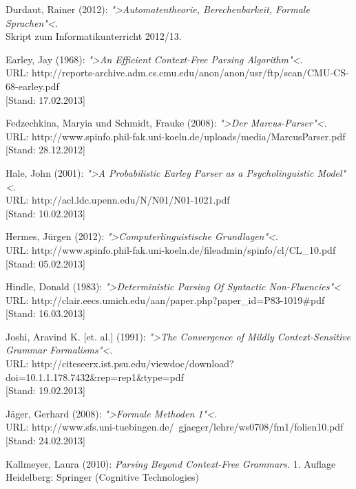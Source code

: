 \documentclass[12pt,a4paper]{article}
\theoremstyle{definition}
\begin{document}
\begin{thebibliography}{99}
		Durdaut, Rainer (2012):
		\emph{">Automatentheorie, Berechenbarkeit, Formale Sprachen"<}.\\
		Skript zum Informatikunterricht 2012/13.

		Earley, Jay (1968):
		\emph{">An Efficient Context-Free Parsing Algorithm"<}.\\
		URL: http://reports-archive.adm.cs.cmu.edu/anon/anon/usr/ftp/scan/CMU-CS-68-earley.pdf\\
		{[Stand: 17.02.2013]}

		Fedzechkina, Maryia und Schmidt, Frauke (2008):
		\emph{">Der Marcus-Parser"<}.\\
		URL: http://www.spinfo.phil-fak.uni-koeln.de/uploads/media/MarcusParser.pdf\\
		{[Stand: 28.12.2012]}

		Hale, John (2001):
		\emph{">A Probabilistic Earley Parser as a Psycholinguistic Model"<}.\\
		URL: http://acl.ldc.upenn.edu/N/N01/N01-1021.pdf\\
		{[Stand: 10.02.2013]}

		Hermes, Jürgen (2012):
		\emph{">Computerlinguistische Grundlagen"<}.\\
		URL: http://www.spinfo.phil-fak.uni-koeln.de/fileadmin/spinfo/cl/CL\_10.pdf\\
		{[Stand: 05.02.2013]}

		Hindle, Donald (1983):
		\emph{">Deterministic Parsing Of Syntactic Non-Fluencies"<}\\
		URL: http://clair.eecs.umich.edu/aan/paper.php?paper\_id=P83-1019\#pdf\\
		{[Stand: 16.03.2013]}

		Joshi, Aravind K. [et. al.] (1991):
		\emph{">The Convergence of Mildly Context-Sensitive Grammar Formalisms"<}.\\
		URL: http://citeseerx.ist.psu.edu/viewdoc/download?doi=10.1.1.178.7432\&rep=rep1\&type=pdf\\
		{[Stand: 19.02.2013]}
	
		Jäger, Gerhard (2008):
		\emph{">Formale Methoden 1"<}.\\
		URL: http://www.sfs.uni-tuebingen.de/~gjaeger/lehre/ws0708/fm1/folien10.pdf\\
		{[Stand: 24.02.2013]}

		Kallmeyer, Laura (2010):
		\emph{Parsing Beyond Context-Free Grammars.}
		1. Auflage
		Heidelberg: Springer (Cognitive Technologies)
	

\end{thebibliography}
\end{document}
